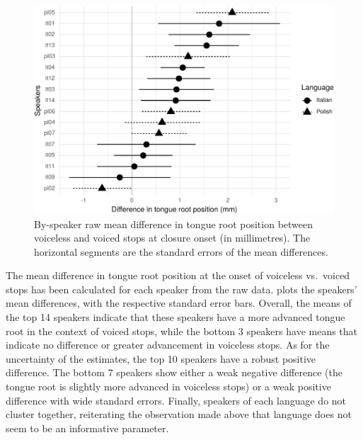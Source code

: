 \documentclass[preprint]{JASAnew}
\begin{document}
\begin{figure}
\includegraphics[width=\linewidth]{./Figure9-1} \caption{By-speaker raw mean difference in tongue root position between voiceless and voiced stops at closure onset (in millimetres). The horizontal segments are the standard errors of the mean differences.}\label{f:Figure9}
\end{figure}

The mean difference in tongue root position at the onset of voiceless
vs.~voiced stops has been calculated for each speaker from the raw data.
 plots the speakers' mean differences, with the
respective standard error bars. Overall, the means of the top 14
speakers indicate that these speakers have a more advanced tongue root
in the context of voiced stops, while the bottom 3 speakers have means
that indicate no difference or greater advancement in voiceless stops.
As for the uncertainty of the estimates, the top 10 speakers have a
robust positive difference. The bottom 7 speakers show either a weak
negative difference (the tongue root is slightly more advanced in
voiceless stops) or a weak positive difference with wide standard
errors. Finally, speakers of each language do not cluster together,
reiterating the observation made above that language does not seem to be
an informative parameter.
\end{document}
